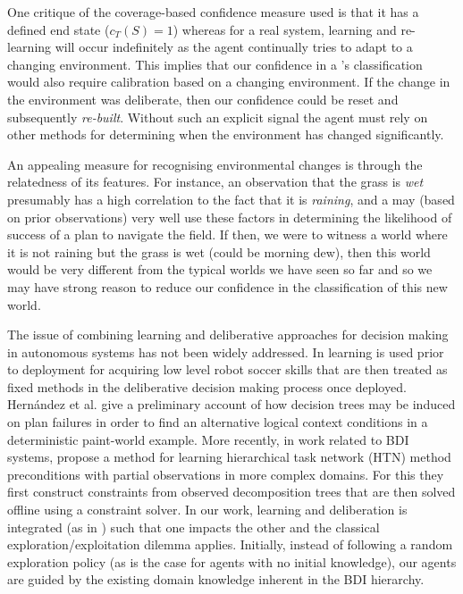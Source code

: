One critique of the coverage-based confidence measure used is that it has a defined end state ($c_T(S)=1$) whereas for a real system, learning and re-learning will occur indefinitely as the agent continually tries to adapt to a changing environment. This implies that our confidence in a \dt's classification would also require calibration based on a changing environment. If the change in the environment was deliberate, then our confidence could be reset and subsequently \textit{re-built}. Without such an explicit signal the agent must rely on other methods for determining when the environment has changed significantly.

An appealing measure for recognising environmental changes is through the relatedness of its features. For instance, an observation that the grass is \textit{wet} presumably has a high correlation to the fact that it is \textit{raining}, and a \dt may (based on prior observations) very well use these factors in determining the likelihood of success of a plan to navigate the field. If then, we were to witness a world where it is not raining but the grass is wet (could be morning dew), then this world would be very different from the typical worlds we have seen so far and so we may have strong reason to reduce our confidence in the \dt classification of this new world.

The issue of combining learning and deliberative approaches for decision making in autonomous systems has not been widely addressed. In \cite{Riedmiller01} learning is used prior to deployment for acquiring low level robot soccer skills that are then treated as fixed methods in the deliberative decision making process once deployed. Hern\'andez et al. \cite{Hernandez04:Learning} give a preliminary account of how decision trees may be induced on plan failures in order to find an alternative logical context conditions in a deterministic paint-world example. More recently, in work related to BDI systems, \cite{Zhuo09:Learning} propose a method for learning hierarchical task network (HTN) method preconditions with partial observations in more complex domains. For this they first construct constraints from observed decomposition trees that are then solved offline using a constraint solver. In our work, learning and deliberation is integrated (as in \cite{APSS08}) such that one impacts the other and the classical exploration/exploitation dilemma applies. Initially, instead of following a random exploration policy (as is the case for agents with no initial knowledge), our agents are guided by the existing domain knowledge inherent in the BDI hierarchy.
